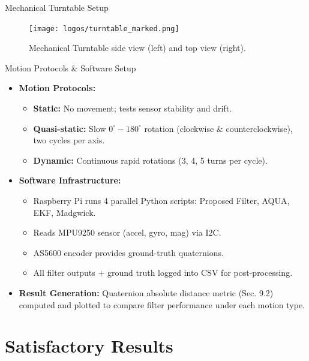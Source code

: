 \documentclass[aspectratio=169,xcolor=dvipsnames]{beamer}
\begin{document}
  \begin{frame}{Mechanical Turntable Setup}
  \begin{figure}
    \centering
    \texttt{[image: logos/turntable\_marked.png]}  
    \caption{Mechanical Turntable side view (left) and top view (right).}    
    \label{fig:turntable}
  \end{figure}
  \end{frame}
  
  
  \begin{frame}{Motion Protocols \& Software Setup}
  \begin{itemize}
      \item<1-> \textbf{Motion Protocols:}
      \begin{itemize}
          \item \textbf{Static:} No movement; tests sensor stability and drift.  
          \item \textbf{Quasi-static:} Slow $0^{\circ}\!\!-\!180^{\circ}$ rotation (clockwise \& counterclockwise), two cycles per axis.  
          \item \textbf{Dynamic:} Continuous rapid rotations (3, 4, 5 turns per cycle).
      \end{itemize}
  
      \item<2-> \textbf{Software Infrastructure:}  
      \begin{itemize}
          \item Raspberry Pi runs 4 parallel Python scripts: Proposed Filter, AQUA, EKF, Madgwick.  
          \item Reads MPU9250 sensor (accel, gyro, mag) via I2C.  
          \item AS5600 encoder provides ground-truth quaternions.  
          \item All filter outputs + ground truth logged into CSV for post-processing.
      \end{itemize}
  
      \item<3-> \textbf{Result Generation:}  
      Quaternion absolute distance metric (Sec. 9.2) computed and plotted to compare filter performance under each motion type.
  \end{itemize}
  \end{frame}

\section{Satisfactory Results}
\end{document}

